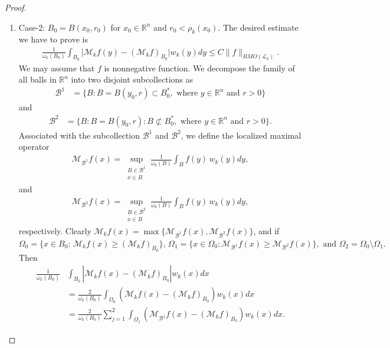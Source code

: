 \documentclass[11pt, reqno]{amsproc}
\theoremstyle{definition}
\theoremstyle{remark}
\numberwithin{equation}{section}
\begin{document}
\begin{proof}
\begin{enumerate}[$i)$]
 
     \item Case-2: $B_0=B(x_0, r_0)$ for $x_0 \in \mathbb{R}^n$ and $r_0 < {\rho_k}(x_0)$. The desired estimate we have to prove is 
     \begin{align} \label{case-1}
         \frac{1}{\omega_k(B_0)} \int_{B_0} |\mathcal{M}_kf(y)- (\mathcal{M}_kf)_{B_0}\big| w_k(y)dy \leq C\|f\|_{BMO(\mathcal{L}_k)}.
     \end{align} We may assume that $f$ is nonnegative function.
     We decompose the family of all balls in $\mathbb{R}^n$ into two disjoint subcollections as 
     \begin{align*}
         \mathcal{B}^1 & = \{B:  B= B(y_0, r) \subset B_0^*, \text{ where $y\in \mathbb{R}^n$ and $r>0$}\} 
         \end{align*} and
         \begin{align*}
          \mathcal{B}^2 & = \{B: B= B(y_0, r): B \not\subset B_0^*, \text{ where $y\in \mathbb{R}^n$ and $r>0$} \}. 
     \end{align*}
Associated with the subcollection $\mathcal{B}^1$ and $\mathcal{B}^2$, we define the localized maximal operator 
\begin{align*}
   \mathcal{M}_{\mathcal{B}^1}f(x) =  \sup_{\substack{B \in \mathcal{B}^1 \\ x \in B}} \frac{1}{\omega_k(B)} \int_B f(y)\, w_k(y)dy, 
\end{align*}
and 
\begin{align*}
  \mathcal{M}_{\mathcal{B}^2}f(x)  = \sup_{\substack{B \in \mathcal{B}^2 \\ x \in B}} \frac{1}{\omega_k(B)} \int_B f(y)\, w_k(y)dy, 
\end{align*}
respectively. Clearly $\mathcal{M}_k f(x) = \max\{\mathcal{M}_{\mathcal{B}^1}f(x), \mathcal{M}_{\mathcal{B}^2}f(x)\}$, and if $ \Omega_0=\{x\in B_0:\, \mathcal{M}_kf(x) \geq (\mathcal{M}_kf)_{B_0} \}, \,  \Omega_1= \{x\in \Omega_0: \mathcal{M}_{\mathcal{B}^1}f(x) \geq \mathcal{M}_{\mathcal{B}^2}f(x)\}, \text{ and } \Omega_2 = \Omega_0\setminus\Omega_1. $ Then 
    \begin{align*}
        \frac{1}{\omega_k(B_0)} &\int_{B_0} |\mathcal{M}_kf(x) - \left( \mathcal{M}_kf\right)_{B_0}|w_k(x)dx \\  &= \frac{2}{\omega_k(B_0)} \int_{\Omega_0} \left( \mathcal{M}_kf(x) - \left( \mathcal{M}_kf\right)_{B_0} \right) w_k(x)dx\\
        & = \frac{2}{\omega_k(B_0)}
        \sum\limits_{j=1}^2\int_{\Omega_j} \left( \mathcal{M}_{\mathcal{B}^j}f(x) - \left( \mathcal{M}_kf\right)_{B_0} \right) w_k(x)dx. 

\end{align*}
\end{enumerate}
\end{proof}
\end{document}
